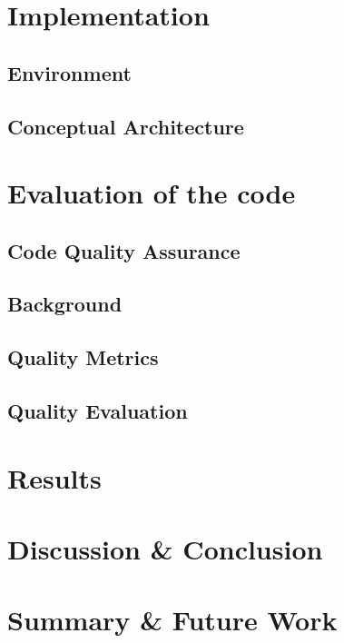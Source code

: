 \documentclass[draft,final]{vutinfth} %
\begin{document}
\chapter{Implementation}\label{chap:implementation}
\section{Environment}
\section{Conceptual Architecture}




\chapter{Evaluation of the code}
\section{Code Quality Assurance}
\section{Background}
\section{Quality Metrics}
\section{Quality Evaluation}



\chapter{Results}



\chapter{Discussion \& Conclusion}



\chapter{Summary \& Future Work}
\end{document}
